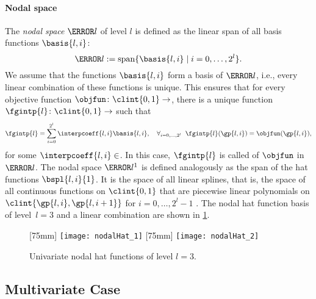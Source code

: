 \paragraph{Nodal space}

The \emph{nodal space} $\ns{l}$ of level $l$
is defined as the linear span of all basis functions
$\basis{l,i}$:
\begin{equation}
  \ns{l} := \spn\{\basis{l,i} \mid i = 0, \dotsc, 2^l\}.
\end{equation}
We assume that the functions $\basis{l,i}$ form a basis of $\ns{l}$, i.e.,
every linear combination of these functions is unique.
This ensures that for every objective function $\objfun\colon \clint{0, 1} \to \real$,
there is a unique function $\fgintp{l}\colon \clint{0, 1} \to \real$ such that
\begin{equation}
  \label{eq:interpFullGridUV}
  \fgintp{l}
  = \sum_{i=0}^{2^l} \interpcoeff{l,i} \basis{l,i},\quad
  \falarge{i = 0, \dotsc, 2^l}{\fgintp{l}(\gp{l,i}) = \objfun(\gp{l,i})},
\end{equation}
for some $\interpcoeff{l,i} \in \real$.
In this case, $\fgintp{l}$ is called  of $\objfun$ in $\ns{l}$.
The nodal space $\ns{l}^1$ is defined analogously as the span of the
hat functions $\bspl{l,i}{1}$.
It is the space of all linear splines,
that is, the space of all continuous functions on $\clint{0, 1}$ that are
piecewise linear polynomials on $\clint{\gp{l,i}, \gp{l,i+1}}$ for
$i = 0, \dotsc, 2^l - 1$ \cite{Hoellig13Approximation}.
The nodal hat function basis of level~$l = 3$
and a linear combination are shown in \cref{fig:nodalHat}.

\begin{figure}
  [75mm]{%
    \texttt{[image: nodalHat\_1]}%
  }%
  \hfill%
  [75mm]{%
    \texttt{[image: nodalHat\_2]}%
  }%
  \caption[%
    Univariate nodal hat functions%
  ]{%
    Univariate nodal hat functions of level $l = 3$.%
  }%
  \label{fig:nodalHat}%
\end{figure}



\subsection{Multivariate Case}
\label{sec:212nodalMV}

